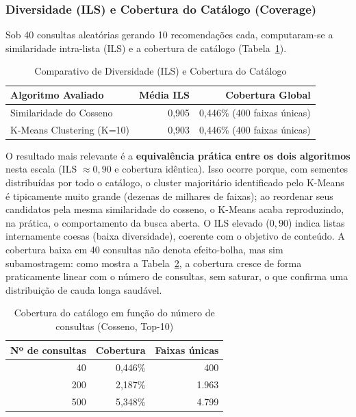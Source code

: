 \documentclass[12pt]{article}
\begin{document}
\subsubsection{Diversidade (ILS) e Cobertura do Catálogo (Coverage)}
Sob 40 consultas aleatórias gerando 10 recomendações cada, computaram-se a similaridade intra-lista (ILS) e a cobertura de catálogo (Tabela~\ref{tab:ils_cov}).

\begin{table}[H]
\centering
\caption{Comparativo de Diversidade (ILS) e Cobertura do Catálogo}
\label{tab:ils_cov}
\begin{tabular}{lrr}
\toprule
\textbf{Algoritmo Avaliado} & \textbf{Média ILS} & \textbf{Cobertura Global} \\
\midrule
Similaridade do Cosseno & 0,905 & 0,446\% (400 faixas únicas) \\
K-Means Clustering (K=10) & 0,903 & 0,446\% (400 faixas únicas) \\
\bottomrule
\end{tabular}
\end{table}

O resultado mais relevante é a \textbf{equivalência prática entre os dois algoritmos} nesta escala (ILS $\approx 0,90$ e cobertura idêntica). Isso ocorre porque, com sementes distribuídas por todo o catálogo, o cluster majoritário identificado pelo K-Means é tipicamente muito grande (dezenas de milhares de faixas); ao reordenar seus candidatos pela mesma similaridade do cosseno, o K-Means acaba reproduzindo, na prática, o comportamento da busca aberta. O ILS elevado ($0,90$) indica listas internamente coesas (baixa diversidade), coerente com o objetivo de conteúdo. A cobertura baixa em 40 consultas não denota efeito-bolha, mas sim subamostragem: como mostra a Tabela~\ref{tab:coverage_sweep}, a cobertura cresce de forma praticamente linear com o número de consultas, sem saturar, o que confirma uma distribuição de cauda longa saudável.

\begin{table}[H]
\centering
\caption{Cobertura do catálogo em função do número de consultas (Cosseno, Top-10)}
\label{tab:coverage_sweep}
\begin{tabular}{rrr}
\toprule
\textbf{Nº de consultas} & \textbf{Cobertura} & \textbf{Faixas únicas} \\
\midrule
40  & 0,446\% & 400 \\
200 & 2,187\% & 1.963 \\
500 & 5,348\% & 4.799 \\
\bottomrule
\end{tabular}
\end{table}
\end{document}

